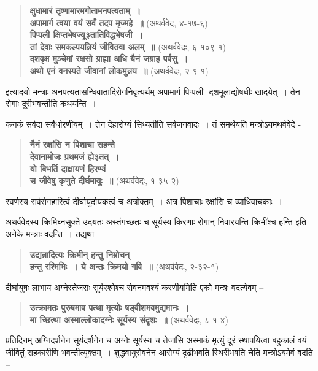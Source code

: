 \begin{verse}
\textbf{क्षुधामारं तृष्णामारमगोतामनपत्यताम्~।}\\
\textbf{अपामार्ग त्वया वयं सर्वं तदप मृज्महे~॥} (अथर्ववेद, ४-१७-६)\\
\textbf{पिप्पली क्षिप्तभेषज्यू३तातिविद्धभेषजी~।}\\
\textbf{तां देवाः समकल्पयन्नियं जीवितवा अलम्~॥} (अथर्ववेदः, ६-१०९-१)\\
\textbf{दशवृक्ष मुञ्चेमां रक्षसो ग्राह्या अधि यैनं जग्राह पर्वसु~।}\\
\textbf{अथो एनं वनस्पते जीवानां लोकमुन्नय~॥} (अथर्ववेदः, २-९-१)
\end{verse}

इत्यादयो मन्त्राः अनपत्यतासन्धिवातादिरोगनिवृत्यर्थम् अपामार्ग-पिप्पली- दशमूलाद्योषधीः खादयेत्~। तेन रोगाः दूरीभवन्तीति कथयन्ति~।

कनकं सर्वदा सर्वैर्धारणीयम्~। तेन देहारोग्यं सिध्यतीति सर्वजनवादः~। तं समर्थयति मन्त्रोऽयमथर्ववेदे -

\begin{verse}
\textbf{नैनं रक्षांसि न पिशाचा सहन्ते}\\
\textbf{देवानामोजः प्रथमजं ह्ये३तत्~।}\\
\textbf{यो बिभर्ति दाक्षायणं हिरण्यं}\\
\textbf{स जीवेषु कृणुते दीर्घमायुः~॥} (अथर्ववेदः, १-३५-२)
\end{verse}

स्वर्णस्य सर्वरोगहारित्वं दीर्घायुर्दायकत्वं च अत्रोक्तम्~। अत्र पिशाचाः रक्षांसि च व्याधिवाचकाः~।

अथर्ववेदस्य क्रिमिघ्नसूक्ते उदयतः अस्तंगच्छतः च सूर्यस्य किरणाः रोगान् निवारयन्ति क्रिमींश्च हन्ति इति अनेके मन्त्राः वदन्ति~। तद्यथा –

\begin{verse}
\textbf{उद्यन्नादित्यः क्रिमीन् हन्तु निम्रोचन्}\\
\textbf{हन्तु रश्मिभिः~। ये अन्तः क्रिमयो गवि~॥} (अथर्ववेदः, २-३२-१)
\end{verse}

दीर्घायुषः लाभाय अग्नेस्तेजसः सूर्यरश्मेश्च सेवनमवश्यं करणीयमिति एको मन्त्रः वदत्येवम् –

\begin{verse}
\textbf{उत्क्रामतः पुरुषमाव पत्था मृत्योः षड्वीशमवमुद्यमानः~।}\\
\textbf{मा च्छित्था अस्माल्लोकादग्नेः सूर्यस्य संदृशः~॥} (अथर्ववेदः, ८-१-४)
\end{verse}

प्रतिदिनम् अग्निदर्शनेन सूर्यदर्शनेन च अग्नेः सूर्यस्य च तेजांसि अस्माकं मृत्युं दूरं स्थापयित्वा बहुकालं वयं जीवितुं सहकारीणि भवन्तीत्युक्तम्~। शुद्धवायुसेवनेन आरोग्यं दृढीभवति स्थिरीभवति चेति मन्त्रोऽयमेवं वदति –

